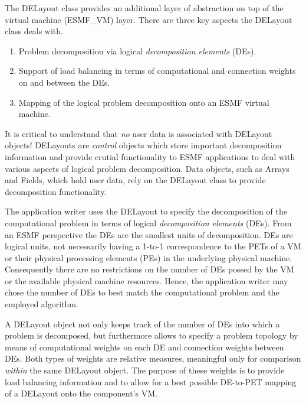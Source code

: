 
The DELayout class provides an additional layer of abstraction on top of the virtual machine (ESMF\_VM) layer. There are three key aspects the DELayout class deals with.

\begin{enumerate}

\item Problem decomposition via logical {\it decomposition elements} (DEs).

\item Support of load balancing in terms of computational and connection weights on and between the DEs. 

\item Mapping of the logical problem decomposition onto an ESMF virtual machine.

\end{enumerate}

It is critical to understand that {\it no} user data is associated with DELayout objects! DELayouts are {\it control} objects which store important decomposition information and provide crutial functionality to ESMF applications to deal with various aspects of logical problem decomposition. Data objects, such as Arrays and Fields, which hold user data, rely on the DELayout class to provide decomposition functionality.

The application writer uses the DELayout to specify the decomposition of the computational problem in terms of logical {\it decomposition elements} (DEs). From an ESMF perspective the DEs are the smallest units of decomposition. DEs are logical units, not necessarily having a 1-to-1 correspondence to the PETs of a VM or their physical processing elements (PEs) in the underlying physical machine. Consequently there are no restrictions on the number of DEs possed by the VM or the available physical machine resources. Hence, the application writer may chose the number of DEs to best match the computational problem and the employed algorithm.

A DELayout object not only keeps track of the number of DEs into which a problem is decomposed, but furthermore allows to specify a problem topology by means of computational weights on each DE and connection weights between DEs. Both types of weights are relative measures, meaningful only for comparison {\it within} the same DELayout object. The purpose of these weights is to provide load balancing information and to allow for a best possible DE-to-PET mapping of a DELayout onto the component's VM.

